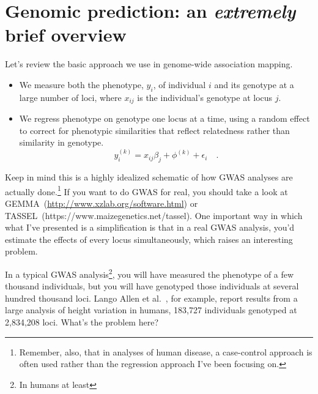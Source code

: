 \chapter{Genomic prediction: an {\it extremely\/} brief overview}

Let's review the basic approach we use in genome-wide association
mapping.

\begin{itemize}

\item We measure both the phenotype, $y_i$, of individual $i$ and its
  genotype at a large number of loci, where $x_{ij}$ is the
  individual's genotype at locus $j$.

\item We regress phenotype on genotype one locus at a time, using a
  random effect to correct for phenotypic similarities that reflect
  relatedness rather than similarity in genotype. 
\[
y_i^{(k)} = x_{ij}\beta_j + \phi^{(k)} + \epsilon_i \quad .
\]

\end{itemize}

Keep in mind this is a highly idealized schematic of how GWAS analyses
are actually done.\footnote{Remember, also, that in analyses of human
  disease, a case-control approach is often used rather than the
  regression approach I've been focusing on.} If you want to do GWAS
for real, you should take a look at
GEMMA~(\url{http://www.xzlab.org/software.html}) or
TASSEL~(https://www.maizegenetics.net/tassel). One
important way in which what I've presented is a simplification is that
in a real GWAS analysis, you'd estimate the effects of every locus
simultaneously, which raises an interesting problem.

In a typical GWAS analysis\footnote{In humans at least}, you will have
measured the phenotype of a few thousand individuals, but you will
have genotyped those individuals at several hundred thousand
loci. Lango Allen et al.~\cite{LangoAllen-etal-2010}, for example,
report results from a large analysis of height variation in humans,
183,727 individuals genotyped at 2,834,208 loci. What's the problem
here?

